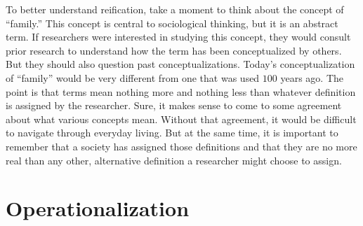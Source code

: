 To better understand reification, take a moment to think about the concept of ``family.'' This concept is central to sociological thinking, but it is an abstract term. If researchers were interested in studying this concept, they would consult prior research to understand how the term has been conceptualized by others. But they should also question past conceptualizations. Today's conceptualization of ``family'' would be very different from one that was used $ 100 $ years ago. The point is that terms mean nothing more and nothing less than whatever definition is assigned by the researcher. Sure, it makes sense to come to some agreement about what various concepts mean. Without that agreement, it would be difficult to navigate through everyday living. But at the same time, it is important to remember that a society has assigned those definitions and that they are no more real than any other, alternative definition a researcher might choose to assign.

\section{Operationalization}

